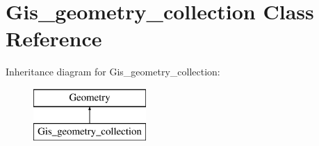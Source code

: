 \hypertarget{classGis__geometry__collection}{}\section{Gis\+\_\+geometry\+\_\+collection Class Reference}
\label{classGis__geometry__collection}
Inheritance diagram for Gis\+\_\+geometry\+\_\+collection\+:\begin{figure}[H]
\begin{center}
\leavevmode
\includegraphics[height=2.000000cm]{classGis__geometry__collection}
\end{center}
\end{figure}
